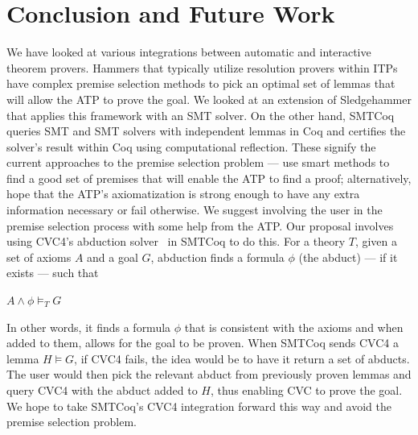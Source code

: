 \documentclass{article}
\begin{document}
\section{Conclusion and Future Work}
\label{sec:conc}
	We have looked at various integrations between 
	automatic and interactive theorem provers.
	Hammers that typically utilize resolution 
	provers within ITPs have complex premise 
	selection methods to pick an optimal set 
	of lemmas that will allow the ATP to prove 
	the goal. We looked at an extension of 
	Sledgehammer that applies this framework 
	with an SMT solver. On the other hand, 
	SMTCoq queries SMT  and SMT solvers with 
	independent lemmas in Coq and certifies the 
	solver's result within Coq using computational
	reflection. These signify the current 
	approaches to the premise selection problem --- 
	use smart methods to find a good set of 
	premises that will enable the ATP to find a 
	proof; alternatively, hope that the ATP's
	axiomatization is strong enough to have any
	extra information necessary or fail otherwise. 
	We suggest involving the user in the premise 
	selection process with some help from the ATP.
	Our proposal involves using CVC4's abduction
	solver~\cite{DBLP:conf/cade/ReynoldsBLT20} in 
	SMTCoq to do this. For a theory $T$, given a
	set of axioms $A$ and a goal $G$, abduction 
	finds a formula $\phi$ (the abduct) --- if it 
	exists --- such that 
	\begin{center}
		$A \land \phi \models_{T} G$
	\end{center}
	In other words, it finds a formula $\phi$ that 
	is consistent with the axioms and when added 
	to them, allows for the goal to be proven. 
	When SMTCoq sends CVC4 a lemma $H \models G$, 
	if CVC4 fails, the idea would be to have it 
	return a set of abducts. The user would then 
	pick the relevant abduct from previously 
	proven lemmas and query CVC4 with the abduct 
	added to $H$, thus enabling CVC to prove the 
	goal. We hope to take SMTCoq's CVC4 integration 
	forward this way and avoid the premise 
	selection problem.


\end{document}

